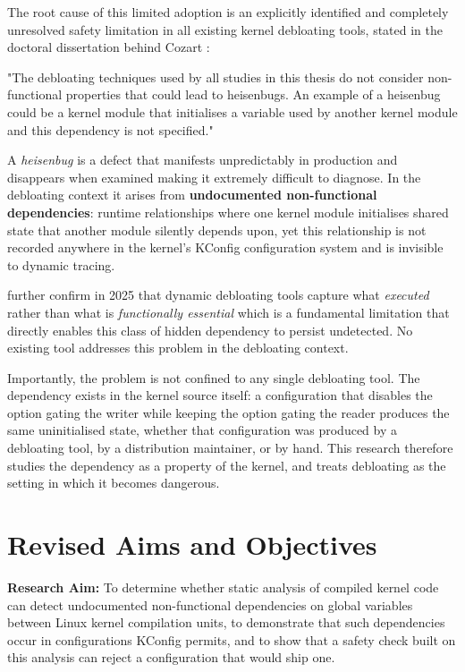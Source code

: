 \documentclass[12pt, a4paper, oneside]{book}
\begin{document}
The root cause of this limited adoption is an explicitly identified and completely
unresolved safety limitation in all existing kernel debloating tools, stated in
the doctoral dissertation behind Cozart \citep{kuo2022dissertation}:

"The debloating techniques used by all studies in this thesis do not
consider non-functional properties that could lead to heisenbugs. An example of
a heisenbug could be a kernel module that initialises a variable used by another
kernel module and this dependency is not specified."

A \textit{heisenbug} is a defect that manifests unpredictably in production and
disappears when examined making it extremely difficult to diagnose. In the
debloating context it arises from \textbf{undocumented non-functional
dependencies}: runtime relationships where one kernel module initialises shared
state that another module silently depends upon, yet this relationship is not
recorded anywhere in the kernel's KConfig configuration system and is invisible
to dynamic tracing.

\citet{gunasekaran2025lean} further confirm in 2025
that dynamic debloating tools capture what \textit{executed} rather than what is
\textit{functionally essential} which is a fundamental limitation that directly
enables this class of hidden dependency to persist undetected. No existing tool
addresses this problem in the debloating context.

Importantly, the problem is not confined to any single debloating tool. The
dependency exists in the kernel source itself: a configuration that disables the
option gating the writer while keeping the option gating the reader produces the
same uninitialised state, whether that configuration was produced by a debloating
tool, by a distribution maintainer, or by hand. This research therefore studies
the dependency as a property of the kernel, and treats debloating as the setting
in which it becomes dangerous.

\section{Revised Aims and Objectives}

\textbf{Research Aim:} To determine whether static analysis of compiled kernel
code can detect undocumented non-functional dependencies on global variables
between Linux kernel compilation units, to demonstrate that such dependencies
occur in configurations KConfig permits, and to show that a safety check built
on this analysis can reject a configuration that would ship one.
\end{document}
